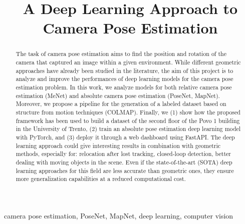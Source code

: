 \documentclass[conference]{IEEEtran}
\begin{document}
\title{A Deep Learning Approach to Camera Pose Estimation}

\author{
\and
{}
}

\maketitle

\thispagestyle{plain}
\pagestyle{plain}

\begin{abstract}
The task of camera pose estimation aims to find the position and rotation of the camera that captured an image within a given environment.
While different geometric approaches have already been studied in the literature, the aim of this project is to analyze and improve the performances of deep learning models for the camera pose estimation problem.
In this work, we analyze models for both relative camera pose estimation (MeNet) and absolute camera pose estimation (PoseNet, MapNet). Moreover, we propose a pipeline for the generation of a labeled dataset based on structure from motion techniques (COLMAP).
Finally, we (1) show how the proposed framework has been used to build a dataset of the second floor of the Povo 1 building in the University of Trento, (2) train an absolute pose estimation deep learning model with PyTorch, and (3) deploy it through a web dashboard using FastAPI.
The deep learning approach could give interesting results in combination with geometric methods, especially for: relocation after lost tracking, closed-loop detection, better dealing with moving objects in the scene. Even if the state-of-the-art (SOTA) deep learning approaches for this field are less accurate than geometric ones, they ensure more generalization capabilities at a reduced  computational cost.
\end{abstract}

\begin{IEEEkeywords}
camera pose estimation, PoseNet, MapNet, deep learning, computer vision
\end{IEEEkeywords}









{}

\end{document}
